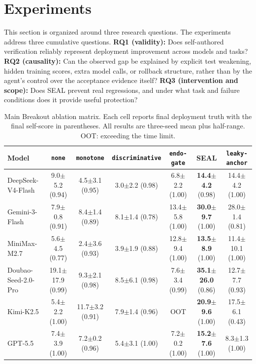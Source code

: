 \documentclass[letterpaper]{article} \usepackage{aaai2027}  \usepackage[hyphens]{url}  \usepackage{graphicx} \urlstyle{rm} \def\UrlFont{\rm}  \usepackage{natbib}  \usepackage{caption} \usepackage{amsfonts} \usepackage{multirow} \frenchspacing  \usepackage{algorithm}
\newcommand{\method}{SEAL}
\begin{document}
\section{Experiments}\label{sec:experiments}


This section is organized around three research questions.
The experiments address three cumulative questions. \textbf{RQ1 (validity):} Does self-authored verification reliably represent deployment improvement across models and tasks? 
\textbf{RQ2 (causality):} Can the observed gap be explained by explicit test weakening, hidden training scores, extra model calls, or rollback structure, rather than by the agent's control over the acceptance evidence itself? 
\textbf{RQ3 (intervention and scope):} Does \method{} prevent real regressions, and under what task and failure conditions does it provide useful protection?




\begin{table}[t]
\centering
\small \setlength{\tabcolsep}{3.5pt}

\begin{tabular}{lcccccc}
\toprule
\textbf{Model} & \texttt{none} & \texttt{monotone} & \texttt{discriminative} & \texttt{endo-gate} & \textbf{\method{}} & \texttt{leaky-anchor} \\
\midrule
DeepSeek-V4-Flash & 9.0$\pm$5.2 (0.94) & 4.5$\pm$3.1 (0.95) & 3.0$\pm$2.2 (0.98) & 6.8$\pm$2.2 (1.00) & \textbf{14.4$\pm$4.2} (0.98)  & 14.4$\pm$4.2 (1.00) \\
Gemini-3-Flash & 7.9$\pm$0.8 (0.91) & 8.4$\pm$1.4 (0.89) & 8.1$\pm$1.4 (0.78) & 13.4$\pm$5.8 (1.00) & \textbf{30.0$\pm$9.7} (1.00) & 28.0$\pm$1.4 (0.81) \\
MiniMax-M2.7 & 5.6$\pm$4.5 (0.77) & 2.4$\pm$3.6 (0.93) & 3.9$\pm$1.9 (0.88) & 12.8$\pm$9.4 (1.00) & \textbf{13.5$\pm$8.9} (1.00) & 11.4$\pm$10.1 (1.00) \\
Doubao-Seed-2.0-Pro & 19.1$\pm$17.9 (0.99) & 9.3$\pm$2.1 (0.98) & 8.5$\pm$6.1 (0.98) & 7.6$\pm$3.4 (0.99) & \textbf{35.1$\pm$26.0} (0.86) & 12.7$\pm$7.7 (0.93) \\
Kimi-K2.5 & 5.4$\pm$2.2 (1.00) & 11.7$\pm$3.2 (0.91) & 7.9$\pm$1.4 (0.96) & OOT & \textbf{20.9$\pm$9.6} (1.00) & 17.5$\pm$6.1 (0.43) \\
GPT-5.5 & 7.4$\pm$3.9 (1.00) & 7.2$\pm$0.2 (0.96) & 5.4$\pm$3.1 (1.00)& 7.2$\pm$0.2 (1.00)  & \textbf{15.2$\pm$7.6} (1.00) & 8.3$\pm$1.3 (1.00) \\
\bottomrule
\end{tabular}
\caption{
Main Breakout ablation matrix. Each cell reports final deployment truth with the final self-score in parentheses. All results are three-seed mean plus half-range. OOT: exceeding the time limit.}
\label{tab:breakout-ablation-main}
\end{table}
\end{document}
